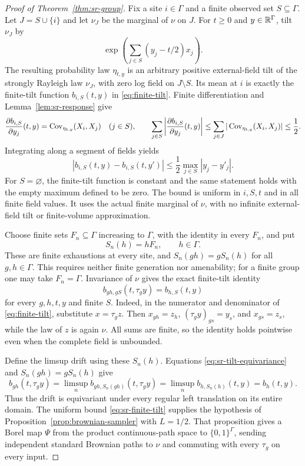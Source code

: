 \begin{proof}[Proof of Theorem~\ref{thm:sr-group}]
Fix a site $i\in\Gamma$ and a finite observed set $S\subseteq\Gamma$.
Let $J=S\cup\{i\}$ and let $\nu_J$ be the marginal of $\nu$ on $J$.
For $t\ge0$ and $y\in\mathbb R^\Gamma$, tilt $\nu_J$ by
\[
 \exp\!\left(\sum_{j\in S}(y_j-t/2)x_j\right).
\]
The resulting probability law $\eta_{t,y}$ is an arbitrary positive
external-field tilt of the strongly Rayleigh law $\nu_J$, with zero log
field on $J\setminus S$. Its mean at $i$ is exactly the finite-tilt
function $b_{i,S}(t,y)$ in \eqref{eq:finite-tilt}. Finite differentiation
and Lemma~\ref{lem:sr-response} give
\[
 \frac{\partial b_{i,S}}{\partial y_j}(t,y)
 =\operatorname{Cov}_{\eta_{t,y}}(X_i,X_j)\quad(j\in S),
 \qquad
 \sum_{j\in S}\left|\frac{\partial b_{i,S}}{\partial y_j}(t,y)\right|
 \le\sum_{j\in J}|\operatorname{Cov}_{\eta_{t,y}}(X_i,X_j)|\le\frac12.
\]
Integrating along a segment of fields yields
\begin{equation}\label{eq:sr-finite-tilt}
 |b_{i,S}(t,y)-b_{i,S}(t,y')|
 \le\frac12\max_{j\in S}|y_j-y'_j|.
\end{equation}
For $S=\varnothing$, the finite-tilt function is constant and the same
statement holds with the empty maximum defined to be zero. The bound is
uniform in $i,S,t$ and in all finite field values. It uses the actual
finite marginal of $\nu$, with no infinite external-field tilt or
finite-volume approximation.

Choose finite sets $F_n\subseteq\Gamma$ increasing to $\Gamma$, with the
identity in every $F_n$, and put
\[
 S_n(h)=hF_n,\qquad h\in\Gamma.
\]
These are finite exhaustions at every site, and
$S_n(gh)=gS_n(h)$ for all $g,h\in\Gamma$. This requires neither finite
generation nor amenability; for a finite group one may take $F_n=\Gamma$.
Invariance of $\nu$ gives the exact finite-tilt identity
\begin{equation}\label{eq:sr-tilt-equivariance}
 b_{gh,gS}(t,\tau_g y)=b_{h,S}(t,y)
\end{equation}
for every $g,h,t,y$ and finite $S$. Indeed, in the numerator and denominator
of \eqref{eq:finite-tilt}, substitute $x=\tau_g z$. Then
$x_{gh}=z_h$, $(\tau_g y)_{gs}=y_s$, and $x_{gs}=z_s$, while the law of
$z$ is again $\nu$. All sums are finite, so the identity holds pointwise
even when the complete field is unbounded.

Define the limsup drift using these $S_n(h)$. Equations
\eqref{eq:sr-tilt-equivariance} and $S_n(gh)=gS_n(h)$ give
\[
 b_{gh}(t,\tau_g y)
 =\limsup_n b_{gh,S_n(gh)}(t,\tau_g y)
 =\limsup_n b_{h,S_n(h)}(t,y)=b_h(t,y).
\]
Thus the drift is equivariant under every regular left translation on its
entire domain. The uniform bound \eqref{eq:sr-finite-tilt} supplies the
hypothesis of Proposition~\ref{prop:brownian-sampler} with $L=1/2$.
That proposition gives a Borel map $\Psi$ from the product continuous-path
space to $\{0,1\}^{\Gamma}$, sending independent standard Brownian paths
to $\nu$ and commuting with every $\tau_g$ on every input.


\end{proof}

